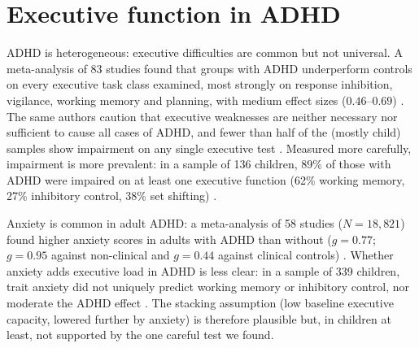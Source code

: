 \section{Executive function in ADHD}\label{sec:adhd}
ADHD is heterogeneous: executive difficulties are common but not universal. A meta-analysis of 83 studies found that groups with ADHD underperform controls on every executive task class examined, most strongly on response inhibition, vigilance, working memory and planning, with medium effect sizes ($0.46$--$0.69$) \citep{willcutt2005ef}. The same authors caution that executive weaknesses are neither necessary nor sufficient to cause all cases of ADHD, and fewer than half of the (mostly child) samples show impairment on any single executive test \citep{willcutt2005ef}. Measured more carefully, impairment is more prevalent: in a sample of 136 children, 89\% of those with ADHD were impaired on at least one executive function (62\% working memory, 27\% inhibitory control, 38\% set shifting) \citep{kofler2019heterogeneity}.

Anxiety is common in adult ADHD: a meta-analysis of 58 studies ($N=18{,}821$) found higher anxiety scores in adults with ADHD than without ($g=0.77$; $g=0.95$ against non-clinical and $g=0.44$ against clinical controls) \citep{hoskins2026anxiety}. Whether anxiety adds executive load in ADHD is less clear: in a sample of 339 children, trait anxiety did not uniquely predict working memory or inhibitory control, nor moderate the ADHD effect \citep{marsh2024anxiety}. The stacking assumption (low baseline executive capacity, lowered further by anxiety) is therefore plausible but, in children at least, not supported by the one careful test we found.
